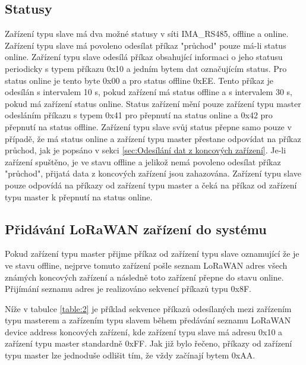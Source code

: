 \subsection{Statusy}
Zařízení typu slave má dva možné statusy v síti IMA\_RS485, offline a online. Zařízení typu slave má povoleno odesílat příkaz "průchod" pouze má-li status online.  
Zařízení typu slave odesílá příkaz obsahující informaci o jeho statusu periodicky s typem příkazu 0x10 a jedním bytem dat označujícím status. 
Pro status online je tento byte 0x00 a pro status offline 0xEE. 
Tento příkaz je odesílán s intervalem 10 s, pokud zařízení má status offline a s intervalem 30 s, pokud má zařízení status online.
Status zařízení mění pouze zařízení typu master odesláním příkazu s typem 0x41 pro přepnutí na status online a 0x42 pro přepnutí na status offline.
Zařízení typu slave svůj status přepne samo pouze v případě, že má status online a zařízení typu master přestane odpovídat na příkaz průchod, jak je popsáno v sekci \ref{sec:Odesílání dat z koncových zařízení}.
Je-li zařízení spuštěno, je ve stavu offline a jelikož nemá povoleno odesílat příkaz "průchod", přijatá data z koncových zařízení jsou zahazována. 
Zařízení typu slave pouze odpovídá na příkazy od zařízení typu master a čeká na příkaz od zařízení typu master k přepnutí na status online.


\subsection{Přidávání LoRaWAN zařízení do systému}
Pokud zařízení typu master přijme příkaz od zařízení typu slave oznamující že je ve stavu offline, nejprve tomuto zařízení pošle seznam LoRaWAN adres všech známých koncových zařízení a následně toto zařízení přepne do stavu online.
Přijímání seznamu adres je realizováno sekvencí příkazů typu 0x8F. 

Níže v tabulce \ref{table:2} je příklad sekvence příkazů odesílaných mezi zařízením typu masterem a zařízením typu slavem během předávání seznamu LoRaWAN device address koncových zařízení, kde zařízení typu slave má adresu 0x10 a zařízení typu master standardně 0xFF. Jak již bylo řečeno, příkazy od zařízení typu master lze jednoduše odlišit tím, že vždy začínají bytem 0xAA.


